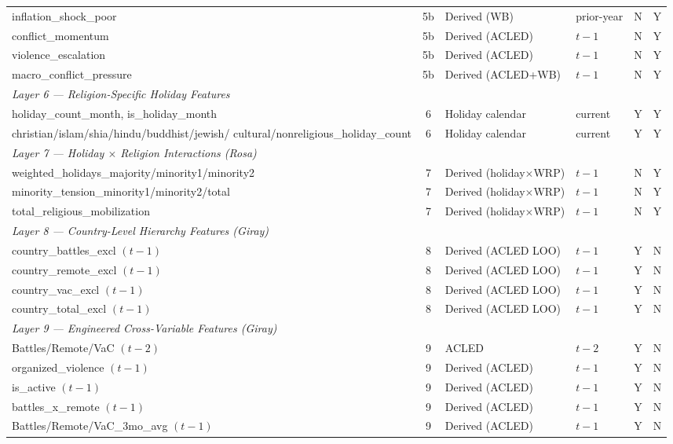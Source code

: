 \documentclass[12pt,a4paper]{article}
\begin{document}
\begin{longtable}{p{6.2cm} c p{3cm} l c c}
inflation\_shock\_poor & 5b & Derived (WB) & prior-year & N & Y \\
conflict\_momentum & 5b & Derived (ACLED) & $t-1$ & N & Y \\
violence\_escalation & 5b & Derived (ACLED) & $t-1$ & N & Y \\
macro\_conflict\_pressure & 5b & Derived (ACLED+WB) & $t-1$ & N & Y \\
\multicolumn{6}{l}{\textit{Layer 6 — Religion-Specific Holiday Features}} \\
holiday\_count\_month, is\_holiday\_month & 6 & Holiday calendar & current & Y & Y \\
christian/islam/shia/hindu/buddhist/jewish/ cultural/nonreligious\_holiday\_count & 6 & Holiday calendar & current & Y & Y \\
\multicolumn{6}{l}{\textit{Layer 7 — Holiday $\times$ Religion Interactions (Rosa)}} \\
weighted\_holidays\_majority/minority1/minority2 & 7 & Derived (holiday$\times$WRP) & $t-1$ & N & Y \\
minority\_tension\_minority1/minority2/total & 7 & Derived (holiday$\times$WRP) & $t-1$ & N & Y \\
total\_religious\_mobilization & 7 & Derived (holiday$\times$WRP) & $t-1$ & N & Y \\
\multicolumn{6}{l}{\textit{Layer 8 — Country-Level Hierarchy Features (Giray)}} \\
country\_battles\_excl $(t-1)$ & 8 & Derived (ACLED LOO) & $t-1$ & Y & N \\
country\_remote\_excl $(t-1)$ & 8 & Derived (ACLED LOO) & $t-1$ & Y & N \\
country\_vac\_excl $(t-1)$ & 8 & Derived (ACLED LOO) & $t-1$ & Y & N \\
country\_total\_excl $(t-1)$ & 8 & Derived (ACLED LOO) & $t-1$ & Y & N \\
\multicolumn{6}{l}{\textit{Layer 9 — Engineered Cross-Variable Features (Giray)}} \\
Battles/Remote/VaC $(t-2)$ & 9 & ACLED & $t-2$ & Y & N \\
organized\_violence $(t-1)$ & 9 & Derived (ACLED) & $t-1$ & Y & N \\
is\_active $(t-1)$ & 9 & Derived (ACLED) & $t-1$ & Y & N \\
battles\_x\_remote $(t-1)$ & 9 & Derived (ACLED) & $t-1$ & Y & N \\
Battles/Remote/VaC\_3mo\_avg $(t-1)$ & 9 & Derived (ACLED) & $t-1$ & Y & N \\
\end{longtable}
\end{document}
